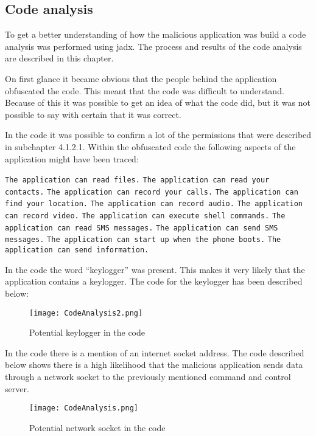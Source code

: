 \subsection{Code analysis}
To get a better understanding of how the malicious application was build a code analysis was performed using jadx.
The process and results of the code analysis are described in this chapter.

On first glance it became obvious that the people behind the application obfuscated the code.
This meant that the code was difficult to understand.
Because of this it was possible to get an idea of what the code did, but it was not possible to say with certain that it was correct.

In the code it was possible to confirm a lot of the permissions that were described in subchapter 4.1.2.1.
Within the obfuscated code the following aspects of the application might have been traced:

\texttt{The application can read files.}
\newline \texttt{The application can read your contacts.}
\newline \texttt{The application can record your calls.}
\newline \texttt{The application can find your location.}
\newline \texttt{The application can record audio.}
\newline \texttt{The application can record video.}
\newline \texttt{The application can execute shell commands.}
\newline \texttt{The application can read SMS messages.}
\newline \texttt{The application can send SMS messages.}
\newline \texttt{The application can start up when the phone boots.}
\newline \texttt{The application can send information.}

In the code the word “keylogger” was present.
This makes it very likely that the application contains a keylogger.
The code for the keylogger has been described below:

\begin{figure}[H]
    \centering
    \texttt{[image: CodeAnalysis2.png]}
    \caption{Potential keylogger in the code}
    \label{jordy-keylogger}
\end{figure}

In the code there is a mention of an internet socket address.
The code described below shows there is a high likelihood that the malicious application sends data through a network socket to the previously mentioned command and control server. 

\begin{figure}[H]
    \centering
    \texttt{[image: CodeAnalysis.png]}
    \caption{Potential network socket in the code}
    \label{jordy-networksocket}
\end{figure}